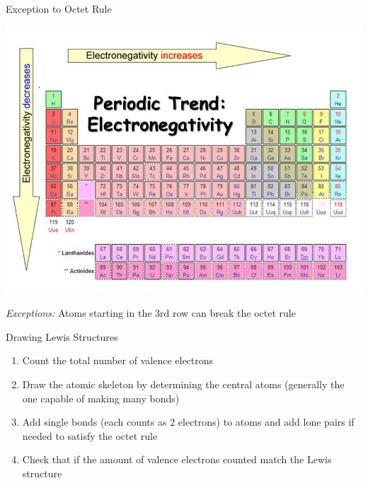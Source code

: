 \documentclass[11pt]{beamer}
\begin{document}
\begin{frame}{Exception to Octet Rule}
  \begin{center}
    \includegraphics[width=0.75\linewidth]{electronegativity}
  \end{center}
  
  \textit{Exceptions:} Atoms starting in the
    3rd row can break the octet rule

\end{frame}

\begin{frame}{Drawing Lewis Structures}
  \begin{enumerate}
  \item Count the total number of valence electrons
  \item Draw the atomic skeleton by determining the central atoms
    (generally the one capable of making many bonds)
  \item Add single bonds (each counts as 2 electrons) to atoms
    and add lone pairs if needed to satisfy the octet rule
  \item Check that if the amount of valence electrons counted match
    the Lewis structure
  \end{enumerate}
\end{frame}

\end{document}
